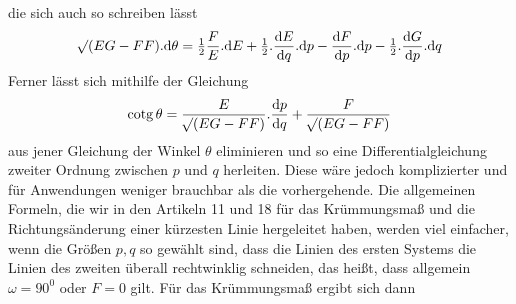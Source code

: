 die sich auch so schreiben lässt
\[
\mathord{{}^{}\!\surd}(EG-FF)\mathord{.}\mathrm{d}\theta=\tfrac{1}{2}\frac{F}{E}\mathord{.}\mathrm{d}E+\tfrac{1}{2}\mathord{.}\frac{\mathrm{d}E}{\mathrm{d}q}\mathord{.}\mathrm{d}p-\frac{\mathrm{d}F}{\mathrm{d}p}\mathord{.}\mathrm{d}p-\tfrac{1}{2}\mathord{.}\frac{\mathrm{d}G}{\mathrm{d}p}\mathord{.}\mathrm{d}q
\]
Ferner lässt sich mithilfe der Gleichung
\[
\mathrm{cotg}\,\theta=\frac{E}{\mathord{{}^{}\!\surd}(EG-FF)}\mathord{.}\frac{\mathrm{d}p}{\mathrm{d}q}+\frac{F}{\mathord{{}^{}\!\surd}(EG-FF)}
\]
aus jener Gleichung der Winkel \(\theta\) eliminieren und so eine Differentialgleichung zweiter Ordnung zwischen \(p\) und \(q\) herleiten. Diese wäre jedoch komplizierter und für Anwendungen weniger brauchbar als die vorhergehende.
Die allgemeinen Formeln, die wir in den Artikeln 11 und 18 für das Krümmungsmaß und die Richtungsänderung einer kürzesten Linie hergeleitet haben, werden viel einfacher, wenn die Größen \(p,q\) so gewählt sind, dass die Linien des ersten Systems die Linien des zweiten überall rechtwinklig schneiden, das heißt, dass allgemein \(\omega=90^0\) oder \(F=0\) gilt. Für das Krümmungsmaß ergibt sich dann
